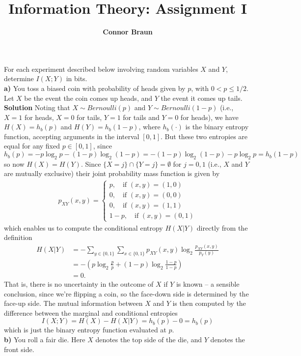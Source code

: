 \documentclass[11pt, letterpaper]{article}
\title{\bf Information Theory: Assignment I}
\author{\bf Connor Braun}
\date{}
\begin{document}
\maketitle
{} For each experiment described below involving random variables $X$ and $Y$, determine $I(X;Y)$ in bits.\\[10pt]
{\bf a)} You toss a biased coin with probability of heads given by $p$, with $0<p\leq 1/2$. Let $X$ be the event the coin comes up heads, and $Y$
the event it comes up tails.\\[10pt]
{\bf Solution} Noting that $X\sim Bernoulli(p)$ and $Y\sim Bernoulli(1-p)$ (i.e., $X=1$ for heads, $X=0$ for tails, $Y=1$ for tails and $Y=0$ for heads), we have $H(X)=h_b(p)$ and $H(Y)=h_b(1-p)$, where $h_b(\cdot)$ is the binary
entropy function, accepting arguments in the interval $[0,1]$. But these two entropies are equal for any fixed $p\in[0,1]$, since
\[h_b(p)=-p\log_2p-(1-p)\log_2(1-p)=-(1-p)\log_2(1-p)-p\log_2p=h_b(1-p)\]
so now $H(X)=H(Y)$. Since $\{X=j\}\cap\{Y=j\}=\emptyset$ for $j=0,1$ (i.e., $X$ and $Y$ are mutually exclusive) their joint probability mass function is given by
\begin{align*}
    p_{XY}(x,y)=\begin{cases}
        p,\quad\text{if $(x,y)=(1,0)$}\\
        0,\quad\text{if $(x,y)=(0,0)$}\\
        0,\quad\text{if $(x,y)=(1,1)$}\\
        1-p,\quad\text{if $(x,y)=(0,1)$}
    \end{cases}
\end{align*}
which enables us to compute the conditional entropy $H(X|Y)$ directly from the definition
\begin{align*}
    H(X|Y)&=-\sum_{y\in\{0,1\}}\sum_{x\in\{0,1\}}p_{XY}(x,y)\log_2\frac{p_{XY}(x,y)}{p_Y(y)}\\
    &=-\left(p\log_2\frac{p}{p}+(1-p)\log_2\frac{1-p}{1-p}\right)\\
    &=0.
\end{align*}
That is, there is no uncertainty in the outcome of $X$ if $Y$ is known -- a sensible conclusion, since we're flipping a coin, so the face-down side is determined by the face-up side. The mutual information between $X$ and $Y$
is then computed by the difference between the marginal and conditional entropies
\[I(X;Y)=H(X)-H(X|Y)=h_b(p)-0=h_b(p)\]
which is just the binary entropy function evaluated at $p$.\\[10pt]
{\bf b)} You roll a fair die. Here $X$ denotes the top side of the die, and $Y$ denotes the front side.\\[10pt]
\end{document}
